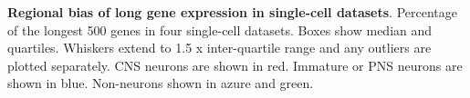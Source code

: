 \textbf{Regional bias of long gene expression in single-cell datasets}. Percentage of the longest 500 genes in four single-cell datasets. Boxes show median and quartiles. Whiskers extend to 1.5 x inter-quartile range and any outliers are plotted separately. CNS neurons are shown in red. Immature or PNS neurons are shown in blue. Non-neurons shown in azure and green.

